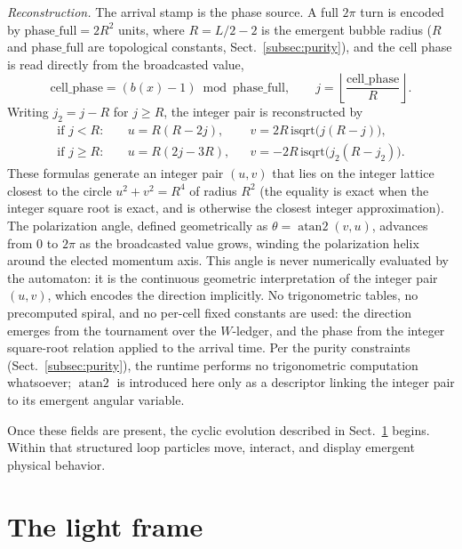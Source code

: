 \documentclass{ijuc}
\begin{document}
\emph{Reconstruction.}  The arrival stamp is the phase source.  A full $2\pi$ turn is encoded by $\mathrm{phase\_full}=2R^{2}$ units, where $R=L/2-2$ is the emergent bubble radius ($R$ and $\mathrm{phase\_full}$ are topological constants, Sect.~\ref{subsec:purity}), and the cell phase is read directly from the broadcasted value,
\[
\mathrm{cell\_phase}=(b(x)-1)\bmod\mathrm{phase\_full}, \qquad j=\left\lfloor\frac{\mathrm{cell\_phase}}{R}\right\rfloor .
\]
Writing $j_{2}=j-R$ for $j\ge R$, the integer pair is reconstructed by
\begin{align}
\text{if }j<R:\quad&u=R(R-2j),          &&v=2R\,\mathrm{isqrt}\bigl(j(R-j)\bigr),\\
\text{if }j\ge R:\quad&u=R(2j-3R),       &&v=-2R\,\mathrm{isqrt}\bigl(j_{2}(R-j_{2})\bigr).
\end{align}
These formulas generate an integer pair $(u,v)$ that lies on the integer lattice closest to the circle $u^{2}+v^{2}=R^{4}$ of radius $R^{2}$ (the equality is exact when the integer square root is exact, and is otherwise the closest integer approximation).  The polarization angle, defined geometrically as $\theta=\operatorname{atan2}(v,u)$, advances from $0$ to $2\pi$ as the broadcasted value grows, winding the polarization helix around the elected momentum axis.  This angle is never numerically evaluated by the automaton: it is the continuous geometric interpretation of the integer pair $(u,v)$, which encodes the direction implicitly.  No trigonometric tables, no precomputed spiral, and no per-cell fixed constants are used: the direction emerges from the tournament over the $W$-ledger, and the phase from the integer square-root relation applied to the arrival time.  Per the purity constraints (Sect.~\ref{subsec:purity}), the runtime performs no trigonometric computation whatsoever; $\operatorname{atan2}$ is introduced here only as a descriptor linking the integer pair to its emergent angular variable.

Once these fields are present, the cyclic evolution described in Sect.~\ref{sec:light-frame} begins.  Within that structured loop particles move, interact, and display emergent physical behavior.


\section{The light frame}\label{sec:light-frame}
\end{document}
